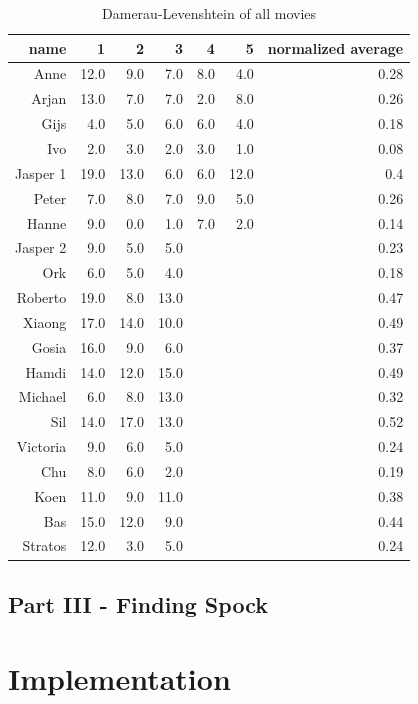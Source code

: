 \begin{table}
\centering
\begin{tabular}{rrrrrrr}
\hline
name	& 1 & 2 & 3 & 4 & 5 & normalized average \\
\hline
Anne	&	12.0	&	9.0		&	7.0	&	8.0	&	4.0	&	0.28\\
Arjan	&	13.0	&	7.0		&	7.0	&	2.0	&	8.0	&	0.26\\
Gijs	&	4.0		&	5.0		&	6.0	&	6.0	&	4.0	&	0.18\\
Ivo		&	2.0		&	3.0		&	2.0	&	3.0	&	1.0	&	0.08\\
Jasper 1	&	19.0	&	13.0	&	6.0	&	6.0	&	12.0 &	0.4\\
Peter	&	7.0		&	8.0		&	7.0	&	9.0	&	5.0	&	0.26\\
Hanne	&	9.0		&	0.0		&	1.0	&	7.0	&	2.0	&	0.14\\
Jasper 2	&	9.0		&	5.0		&	5.0 & & & 0.23\\
Ork		&	6.0		&	5.0		&	4.0	& & & 0.18\\
Roberto	&	19.0	&	8.0		&	13.0 & & & 0.47\\
Xiaong	&	17.0	&	14.0	&	10.0 & & & 0.49\\
\hline
Gosia	&	16.0	&	9.0		&	6.0 & & & 0.37\\
Hamdi	&	14.0	&	12.0	&	15.0 & & & 0.49\\
Michael	&	6.0		&	8.0		&	13.0 & & & 0.32\\
Sil		&	14.0	&	17.0	&	13.0 & & & 0.52\\
Victoria	&	9.0	&	6.0		&	5.0 & & & 0.24\\
Chu		&	8.0		&	6.0		&	2.0 & & & 0.19\\
\hline
Koen	&	11.0	&	9.0		&	11.0 & & & 0.38\\
Bas		&	15.0	&	12.0	&	9.0 & & & 0.44\\
Stratos	&	12.0	&	3.0		&	5.0 & & & 0.24\\

\hline
\end{tabular}
\caption{Damerau-Levenshtein of all movies}
\end{table}

\subsection{Part III - Finding Spock}




\section{Implementation}

